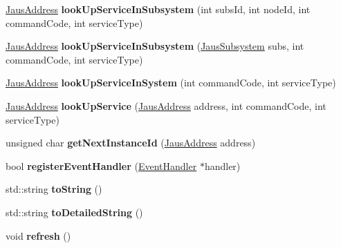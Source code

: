 \begin{DoxyCompactItemize}
\item 
\hypertarget{class_system_tree_a19cc5dd869a0f9fcc07023b17f2450e0}{\hyperlink{struct_jaus_address_struct}{\-Jaus\-Address} {\bfseries look\-Up\-Service\-In\-Subsystem} (int subs\-Id, int node\-Id, int command\-Code, int service\-Type)}\label{class_system_tree_a19cc5dd869a0f9fcc07023b17f2450e0}

\item 
\hypertarget{class_system_tree_a478a03418b96db6a91962c4f8eead9fb}{\hyperlink{struct_jaus_address_struct}{\-Jaus\-Address} {\bfseries look\-Up\-Service\-In\-Subsystem} (\hyperlink{struct_jaus_subsystem_struct}{\-Jaus\-Subsystem} subs, int command\-Code, int service\-Type)}\label{class_system_tree_a478a03418b96db6a91962c4f8eead9fb}

\item 
\hypertarget{class_system_tree_acc95ab473d29d2a39b4b5c829e3e3f4a}{\hyperlink{struct_jaus_address_struct}{\-Jaus\-Address} {\bfseries look\-Up\-Service\-In\-System} (int command\-Code, int service\-Type)}\label{class_system_tree_acc95ab473d29d2a39b4b5c829e3e3f4a}

\item 
\hypertarget{class_system_tree_a981f80ef11fc2b0eabdb83c078e87228}{\hyperlink{struct_jaus_address_struct}{\-Jaus\-Address} {\bfseries look\-Up\-Service} (\hyperlink{struct_jaus_address_struct}{\-Jaus\-Address} address, int command\-Code, int service\-Type)}\label{class_system_tree_a981f80ef11fc2b0eabdb83c078e87228}

\item 
\hypertarget{class_system_tree_a1e62426b4e36bf2616e1095c332c9736}{unsigned char {\bfseries get\-Next\-Instance\-Id} (\hyperlink{struct_jaus_address_struct}{\-Jaus\-Address} address)}\label{class_system_tree_a1e62426b4e36bf2616e1095c332c9736}

\item 
\hypertarget{class_system_tree_ad3790fd30d34f4d1ce34f5cbfd7f6b13}{bool {\bfseries register\-Event\-Handler} (\hyperlink{class_event_handler}{\-Event\-Handler} $\ast$handler)}\label{class_system_tree_ad3790fd30d34f4d1ce34f5cbfd7f6b13}

\item 
\hypertarget{class_system_tree_a1fcfecfb84b34adc4cc93cb6053290a1}{std\-::string {\bfseries to\-String} ()}\label{class_system_tree_a1fcfecfb84b34adc4cc93cb6053290a1}

\item 
\hypertarget{class_system_tree_ab27dcbaef80dc7054021b8885ae74a5d}{std\-::string {\bfseries to\-Detailed\-String} ()}\label{class_system_tree_ab27dcbaef80dc7054021b8885ae74a5d}

\item 
\hypertarget{class_system_tree_a3ef0087a66ab1e064459cf00dbdeade9}{void {\bfseries refresh} ()}\label{class_system_tree_a3ef0087a66ab1e064459cf00dbdeade9}

\end{DoxyCompactItemize}
